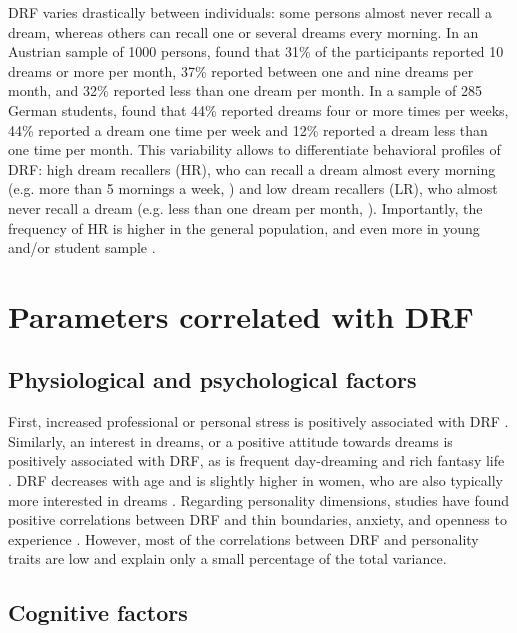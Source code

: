DRF varies drastically between individuals: some persons almost never recall a dream, whereas others can recall one or several dreams every morning. In an Austrian sample of 1000 persons, \citet{stepansky_austrian_1998} found that 31\% of the participants reported 10 dreams or more per month, 37\% reported between one and nine dreams per month, and 32\% reported less than one dream per month. In a sample of 285 German students, \citet{schredl_questionnaires_2002} found that 44\% reported dreams four or more times per weeks, 44\% reported a dream one time per week and 12\% reported a dream less than one time per month. This variability allows to differentiate behavioral profiles of DRF: high dream recallers (HR), who can recall a dream almost every morning (e.g. more than 5 mornings a week, \citealp{schredl_reliability_2005}) and low dream recallers (LR), who almost never recall a dream (e.g. less than one dream per month, \citealp{goodenough_comparison_1959}). Importantly, the frequency of HR is higher in the general population, and even more in young and/or student sample \citep{schredl_reliability_2005}.

\section{Parameters correlated with DRF}
\label{sec:dream-recall:param}

\subsection{Physiological and psychological factors}
\label{sec:dream-recall:param:psych}

First, increased professional or personal stress is positively associated with DRF \citep{schredl_dream_1999}. Similarly, an interest in dreams, or a positive attitude towards dreams is positively associated with DRF, as is frequent day-dreaming and rich fantasy life \citep{schredl_factors_2003}. DRF decreases with age and is slightly higher in women, who are also typically more interested in dreams \citep{schredl_dream_2008, schredl_gender_2008}. Regarding personality dimensions, studies have found positive correlations between DRF and thin boundaries, anxiety, and openness to experience \citep{hartmann_boundaries_1989, schredl_factors_2003,schredl_dream_2003}. However, most of the correlations between DRF and personality traits are low and explain only a small percentage of the total variance.

\subsection{Cognitive factors}
\label{sec:dream-recall:param:cogn}

